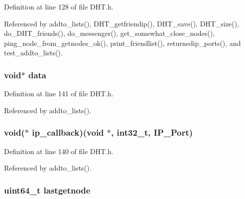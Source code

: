 Definition at line 128 of file D\+H\+T.\+h.



Referenced by addto\+\_\+lists(), D\+H\+T\+\_\+getfriendip(), D\+H\+T\+\_\+save(), D\+H\+T\+\_\+size(), do\+\_\+\+D\+H\+T\+\_\+friends(), do\+\_\+messenger(), get\+\_\+somewhat\+\_\+close\+\_\+nodes(), ping\+\_\+node\+\_\+from\+\_\+getnodes\+\_\+ok(), print\+\_\+friendlist(), returnedip\+\_\+ports(), and test\+\_\+addto\+\_\+lists().

\hypertarget{struct_d_h_t___friend_a735984d41155bc1032e09bece8f8d66d}{
\subsubsection[{data}]{\setlength{\rightskip}{0pt plus 5cm}void$\ast$ data}}\label{struct_d_h_t___friend_a735984d41155bc1032e09bece8f8d66d}


Definition at line 141 of file D\+H\+T.\+h.



Referenced by addto\+\_\+lists().

\hypertarget{struct_d_h_t___friend_abc638e20365d8487c7bc56894c5ef969}{
\subsubsection[{ip\+\_\+callback}]{\setlength{\rightskip}{0pt plus 5cm}void($\ast$ ip\+\_\+callback)(void $\ast$, int32\+\_\+t, {\bf I\+P\+\_\+\+Port})}}\label{struct_d_h_t___friend_abc638e20365d8487c7bc56894c5ef969}


Definition at line 140 of file D\+H\+T.\+h.



Referenced by addto\+\_\+lists().

\hypertarget{struct_d_h_t___friend_acdb8d1d26f42ba99ca73f45cb5643d1e}{
\subsubsection[{lastgetnode}]{\setlength{\rightskip}{0pt plus 5cm}uint64\+\_\+t lastgetnode}}\label{struct_d_h_t___friend_acdb8d1d26f42ba99ca73f45cb5643d1e}


